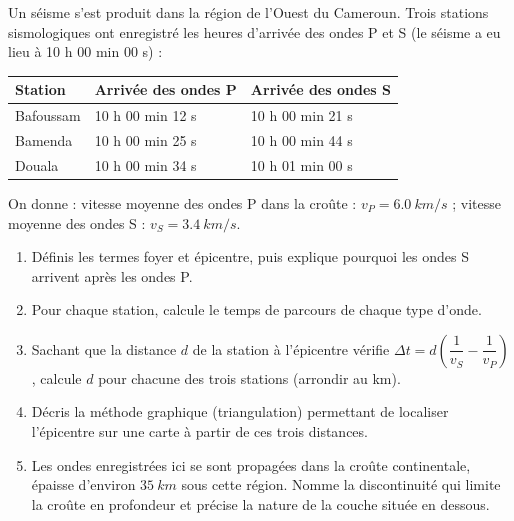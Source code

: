 \documentclass[11pt]{article}
\begin{document}
\begin{exercice}
Un séisme s'est produit dans la région de l'Ouest du Cameroun. Trois stations sismologiques ont enregistré les heures d'arrivée des ondes P et S (le séisme a eu lieu à 10 h 00 min 00 s) :
\begin{center}
\begin{tabularx}{\linewidth}{|l|X|X|}\hline
\rowcolor{popblueL} Station & Arrivée des ondes P & Arrivée des ondes S \\ \hline
Bafoussam & 10 h 00 min 12 s & 10 h 00 min 21 s \\ \hline
Bamenda & 10 h 00 min 25 s & 10 h 00 min 44 s \\ \hline
Douala & 10 h 00 min 34 s & 10 h 01 min 00 s \\ \hline
\end{tabularx}
\end{center}
On donne : vitesse moyenne des ondes P dans la croûte : $v_P = \SI{6,0}{km/s}$ ; vitesse moyenne des ondes S : $v_S = \SI{3,4}{km/s}$.
\begin{enumerate}
\item Définis les termes foyer et épicentre, puis explique pourquoi les ondes S arrivent après les ondes P.
\item Pour chaque station, calcule le temps de parcours de chaque type d'onde.
\item Sachant que la distance $d$ de la station à l'épicentre vérifie $\Delta t = d\left(\dfrac{1}{v_S} - \dfrac{1}{v_P}\right)$, calcule $d$ pour chacune des trois stations (arrondir au km).
\item Décris la méthode graphique (triangulation) permettant de localiser l'épicentre sur une carte à partir de ces trois distances.
\item Les ondes enregistrées ici se sont propagées dans la croûte continentale, épaisse d'environ $\SI{35}{km}$ sous cette région. Nomme la discontinuité qui limite la croûte en profondeur et précise la nature de la couche située en dessous.
\end{enumerate}
\end{exercice}
\end{document}
